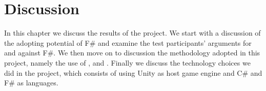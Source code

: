 \chapter{Discussion}
In this chapter we discuss the results of the project. We start with a discussion of the adopting potential of F\# and examine the test participants' arguments for and against F\#. We then move on to discussion the methodology adopted in this project, namely the use of \champagne, \attention and \cognitive. Finally we discuss the technology choices we did in the project, which consists of using Unity as host game engine and C\# and F\# as languages.






